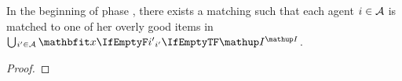 \begin{lemma}
	\label{lem:overly_good_matching}
	In the beginning of phase \phaseiii, there exists a matching such that each agent \(i \in \mathcal{A}\) is matched to one of her overly good items in \(\mathop{\bigcup\hspace{-1pt}_{i' \in \agents}} \alloc[\phasei][i']\).
\end{lemma}
\begin{proof}
%
\end{proof}

